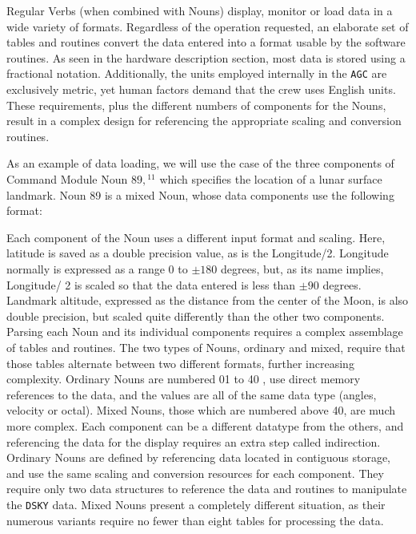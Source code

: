 \documentclass[refcap, oxford]{ahsan}
\begin{document}
Regular Verbs (when combined with Nouns) display, monitor or load data in a wide variety of formats. Regardless of the operation requested, an elaborate set of tables and routines convert the data entered into a format usable by the software routines. As seen in the hardware description section, most data is stored using a fractional notation. Additionally, the units employed internally in the \texttt{AGC} are exclusively metric, yet human factors demand that the crew uses English units. These requirements, plus the different numbers of components for the Nouns, result in a complex design for referencing the appropriate scaling and conversion routines.

As an example of data loading, we will use the case of the three components of Command Module Noun $89,{ }^{11}$ which specifies the location of a lunar surface landmark. Noun 89 is a mixed Noun, whose data components use the following format:

Each component of the Noun uses a different input format and scaling. Here, latitude is saved as a double precision value, as is the Longitude/2. Longitude normally is expressed as a range 0 to $\pm 180$ degrees, but, as its name implies, Longitude/ 2 is scaled so that the data entered is less than $\pm 90$ degrees. Landmark altitude, expressed as the distance from the center of the Moon, is also double precision, but scaled quite differently than the other two components. Parsing each Noun and its individual components requires a complex assemblage of tables and routines. The two types of Nouns, ordinary and mixed, require that those tables alternate between two different formats, further increasing complexity. Ordinary Nouns are numbered 01 to 40 , use direct memory references to the data, and the values are all of the same data type (angles, velocity or octal). Mixed Nouns, those which are numbered above 40, are much more complex. Each component can be a different datatype from the others, and referencing the data for the display requires an extra step called indirection. Ordinary Nouns are defined by referencing data located in contiguous storage, and use the same scaling and conversion resources for each component. They require only two data structures to reference the data and routines to manipulate the \texttt{DSKY} data. Mixed Nouns present a completely different situation, as their numerous variants require no fewer than eight tables for processing the data.

\end{document}
